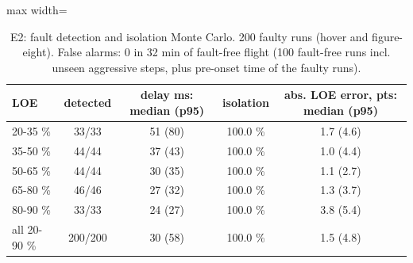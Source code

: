 \begin{table}[t]
\centering
\caption{E2: fault detection and isolation Monte Carlo. 200 faulty runs (hover and figure-eight). False alarms: 0 in 32 min of fault-free flight (100 fault-free runs incl. unseen aggressive steps, plus pre-onset time of the faulty runs).}
\label{tab:e2}
\footnotesize
\setlength{\tabcolsep}{3pt}
\begin{adjustbox}{max width=\linewidth}
\begin{tabular}{lcccc}
\toprule
LOE & detected & delay ms: median (p95) & isolation & abs. LOE error, pts: median (p95) \\
\midrule
20-35 \% & 33/33 & 51 (80) & 100.0 \% & 1.7 (4.6) \\
35-50 \% & 44/44 & 37 (43) & 100.0 \% & 1.0 (4.4) \\
50-65 \% & 44/44 & 30 (35) & 100.0 \% & 1.1 (2.7) \\
65-80 \% & 46/46 & 27 (32) & 100.0 \% & 1.3 (3.7) \\
80-90 \% & 33/33 & 24 (27) & 100.0 \% & 3.8 (5.4) \\
all 20-90 \% & 200/200 & 30 (58) & 100.0 \% & 1.5 (4.8) \\
\bottomrule
\end{tabular}
\end{adjustbox}
\end{table}
